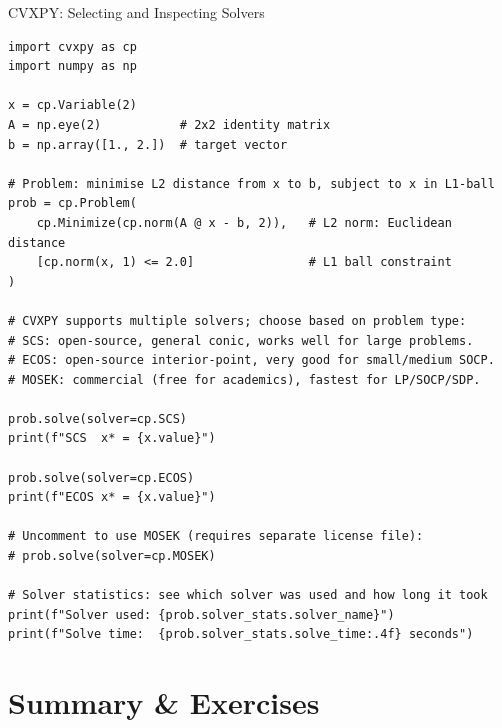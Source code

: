 \documentclass[aspectratio=169,10pt]{beamer}
\begin{document}
\begin{frame}[fragile]{CVXPY: Selecting and Inspecting Solvers}
\begin{lstlisting}[caption={Choosing among multiple backend solvers in CVXPY}]
import cvxpy as cp
import numpy as np

x = cp.Variable(2)
A = np.eye(2)           # 2x2 identity matrix
b = np.array([1., 2.])  # target vector

# Problem: minimise L2 distance from x to b, subject to x in L1-ball
prob = cp.Problem(
    cp.Minimize(cp.norm(A @ x - b, 2)),   # L2 norm: Euclidean distance
    [cp.norm(x, 1) <= 2.0]                # L1 ball constraint
)

# CVXPY supports multiple solvers; choose based on problem type:
# SCS: open-source, general conic, works well for large problems.
# ECOS: open-source interior-point, very good for small/medium SOCP.
# MOSEK: commercial (free for academics), fastest for LP/SOCP/SDP.

prob.solve(solver=cp.SCS)
print(f"SCS  x* = {x.value}")

prob.solve(solver=cp.ECOS)
print(f"ECOS x* = {x.value}")

# Uncomment to use MOSEK (requires separate license file):
# prob.solve(solver=cp.MOSEK)

# Solver statistics: see which solver was used and how long it took
print(f"Solver used: {prob.solver_stats.solver_name}")
print(f"Solve time:  {prob.solver_stats.solve_time:.4f} seconds")
\end{lstlisting}
\end{frame}

\section{Summary \& Exercises}
\end{document}

